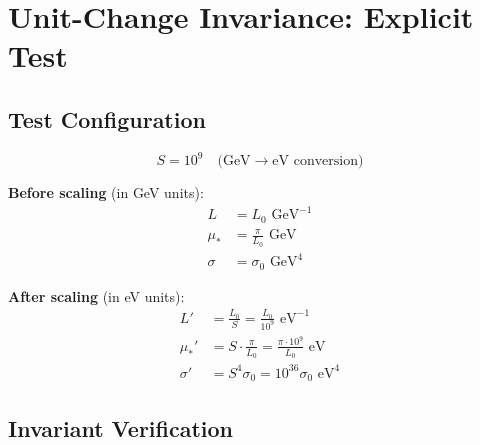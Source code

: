 \documentclass[11pt,a4paper]{article}
\theoremstyle{definition}
\begin{document}
\section{Unit-Change Invariance: Explicit Test}
\label{sec:unit_test}

\subsection{Test Configuration}
\label{subsec:test_config}

\begin{equation}
\label{eq:S_value}
S = 10^9 \quad \text{(GeV} \to \text{eV conversion)}
\end{equation}

\textbf{Before scaling} (in GeV units):
\begin{align}
\label{eq:before_L}
L &= L_0 \text{ GeV}^{-1} \\
\label{eq:before_mu}
\mu_* &= \frac{\pi}{L_0} \text{ GeV} \\
\label{eq:before_sigma}
\sigma &= \sigma_0 \text{ GeV}^4
\end{align}

\textbf{After scaling} (in eV units):
\begin{align}
\label{eq:after_L}
L' &= \frac{L_0}{S} = \frac{L_0}{10^9} \text{ eV}^{-1} \\
\label{eq:after_mu}
\mu_*' &= S \cdot \frac{\pi}{L_0} = \frac{\pi \cdot 10^9}{L_0} \text{ eV} \\
\label{eq:after_sigma}
\sigma' &= S^4 \sigma_0 = 10^{36} \sigma_0 \text{ eV}^4
\end{align}

\subsection{Invariant Verification}
\label{subsec:invariant_verify}
\end{document}
